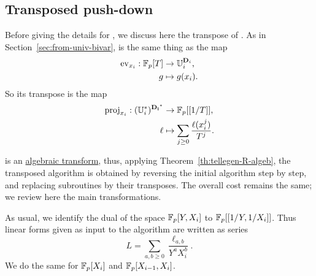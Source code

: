 
\subsection{Transposed push-down}

Before giving the details for \hyperref[alg:liftup]{}, we discuss here the
transpose of \hyperref[alg:push-down]{}.  As in
Section~\ref{sec:from-univ-bivar}, \hyperref[alg:push-down]{} is the same thing
as the map
\begin{equation}
  \label{eq:81}
  \begin{aligned}
    \operatorname{ev}_{x_i}:\mathbb{F}_p[T] &\rightarrow \mathbb{U}_i^{\mathbf{D}_i}\text{,}\\ 
    g&\mapsto g(x_i)\text{.}
  \end{aligned}
\end{equation}
So its transpose is the map
\begin{equation}
  \label{eq:82}
  \begin{aligned}
    \operatorname{proj}_{x_i}:(\mathbb{U}_i^\ast)^{\mathbf{D_i}^\ast}&\rightarrow\mathbb{F}_p[[1/T]]\text{,}\\
    \ell&\mapsto\sum_{j\ge0}\frac{\ell(x_i^j)}{T^j}\text{.}
  \end{aligned}
\end{equation}

\hyperref[alg:push-down]{} is an \hyperref[sec:r-algebraic-transforms]{algebraic
  transform}, thus, applying Theorem~\ref{th:tellegen-R-algeb}, the
transposed algorithm is obtained by reversing the initial algorithm
step by step, and replacing subroutines by their transposes. The
overall cost remains the same; we review here the main
transformations.

As usual, we identify the dual of the space $\mathbb{F}_p[Y,X_i]$ to
$\mathbb{F}_p[[1/Y,1/X_i]]$. Thus linear forms given as input to the algorithm
are written as series
\begin{equation}
  \label{eq:84}
  L=\sum_{a,b\ge0}\frac{\ell_{a,b}}{Y^aX_i^b}
  \text{.}
\end{equation}
We do the same for $\mathbb{F}_p[X_i]$ and $\mathbb{F}_p[X_{i-1},X_i]$.

